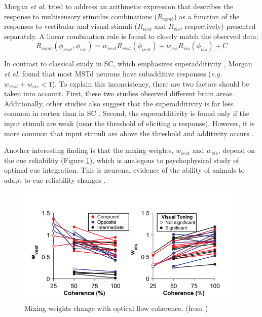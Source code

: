 \documentclass{article}[11pt]
\newcommand{\etal}{\textit{et al. }}
\newcommand{\eg}{\textit{e.g. }}
\begin{document}
Morgan \etal tried to address an arithmetic expression that describes the response to multisensory stimulus combinations ($R_{comb}$) as a function of the responses to vestibular and visual stimuli ($R_{vest}$ and $R_{vis}$, respectively) presented separately. A linear combination rule is found to closely match the observed data:
\begin{equation}
  R_{comb}(\phi_{vest}, \phi_{vis}) = w_{vest} R_{vest}(\phi_{vest}) + w_{vis} R_{vis}(\phi_{vis}) + C 
  \label{eq:lincomb}
\end{equation}

In contrast to classical study in SC, which emphasizes superadditivity \cite{meredith_visual_1986}, Morgan \etal found that most MSTd neurons have subadditive responses (\eg $w_{vest} + w_{vis} < 1$). To explain this inconsistency, there are two factors should be taken into account. First, these two studies observed different brain areas. Additionally, other studies also suggest that the superadditivity is far less common in cortex than in SC \cite{alais_multisensory_2010}. Second, the superadditivity is found only if the input stimuli are weak (near the threshold of eliciting a response). However, it is more common that input stimuli are above the threshold and additivity occurs \cite{stanford_evaluating_2005}.

Another interesting finding is that the mixing weights, $w_{vest}$ and $w_{vis}$, depend on the cue reliability (Figure \ref{fig:weight}), which is analogous to psychophysical study of optimal cue integration.
This is neuronal evidence of the ability of animals to adapt to cue reliability changes .

\begin{figure}[tpbh]
  \centering
  \includegraphics[width=.7\textwidth]{weight}
  \caption{Mixing weights change with optical flow coherence. (from \cite{morgan_multisensory_2008})}
  \label{fig:weight}
\end{figure}

\end{document}
